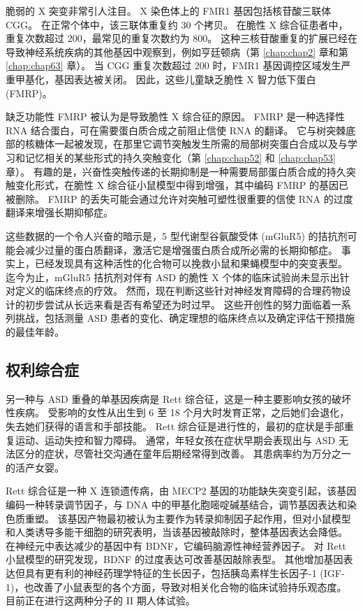 脆弱的 X 突变非常引人注目。 X 染色体上的 FMR1 基因包括核苷酸三联体 CGG。 在正常个体中，该三联体重复约 30 个拷贝。 在脆性 X 综合征患者中，重复次数超过 200，最常见的重复次数约为 800。 这种三核苷酸重复的扩展已经在导致神经系统疾病的其他基因中观察到，例如亨廷顿病（第 \ref{chap:chap2} 章和第 \ref{chap:chap63} 章）。 当 CGG 重复次数超过 200 时，FMR1 基因调控区域发生严重甲基化，基因表达被关闭。 因此，这些儿童缺乏脆性 X 智力低下蛋白 (FMRP)。

缺乏功能性 FMRP 被认为是导致脆性 X 综合征的原因。 FMRP 是一种选择性 RNA 结合蛋白，可在需要蛋白质合成之前阻止信使 RNA 的翻译。 它与树突棘底部的核糖体一起被发现，在那里它调节突触发生所需的局部树突蛋白合成以及与学习和记忆相关的某些形式的持久突触变化（第 \ref{chap:chap52} 和 \ref{chap:chap53} 章）。 有趣的是，兴奋性突触传递的长期抑制是一种需要局部蛋白质合成的持久突触变化形式，在脆性 X 综合征小鼠模型中得到增强，其中编码 FMRP 的基因已被删除。 FMRP 的丢失可能会通过允许对突触可塑性很重要的信使 RNA 的过度翻译来增强长期抑郁症。

这些数据的一个令人兴奋的暗示是，5 型代谢型谷氨酸受体 (mGluR5) 的拮抗剂可能会减少过量的蛋白质翻译，激活它是增强蛋白质合成所必需的长期抑郁症。 事实上，已经发现具有这种活性的化合物可以挽救小鼠和果蝇模型中的突变表型。 迄今为止，mGluR5 拮抗剂对伴有 ASD 的脆性 X 个体的临床试验尚未显示出针对定义的临床终点的疗效。 然而，现在判断这些针对神经发育障碍的合理药物设计的初步尝试从长远来看是否有希望还为时过早。 这些开创性的努力面临着一系列挑战，包括测量 ASD 患者的变化、确定理想的临床终点以及确定评估干预措施的最佳年龄。

\subsection{权利综合症}
另一种与 ASD 重叠的单基因疾病是 Rett 综合征，这是一种主要影响女孩的破坏性疾病。 受影响的女性从出生到 6 至 18 个月大时发育正常，之后她们会退化，失去她们获得的语言和手部技能。 Rett 综合征是进行性的，最初的症状是手部重复运动、运动失控和智力障碍。 通常，年轻女孩在症状早期会表现出与 ASD 无法区分的症状，尽管社交沟通在童年后期经常得到改善。 其患病率约为万分之一的活产女婴。

Rett 综合征是一种 X 连锁遗传病，由 MECP2 基因的功能缺失突变引起，该基因编码一种转录调节因子，与 DNA 中的甲基化胞嘧啶碱基结合，调节基因表达和染色质重塑。 该基因产物最初被认为主要作为转录抑制因子起作用，但对小鼠模型和人类诱导多能干细胞的研究表明，当该基因被敲除时，整体基因表达会降低。 在神经元中表达减少的基因中有 BDNF，它编码脑源性神经营养因子。 对 Rett 小鼠模型的研究发现，BDNF 的过度表达可改善基因敲除表型。 其他增加基因表达但具有更有利的神经药理学特征的生长因子，包括胰岛素样生长因子-1 (IGF-1)，也改善了小鼠表型的各个方面，导致对相关化合物的临床试验持乐观态度。 目前正在进行这两种分子的 II 期人体试验。

